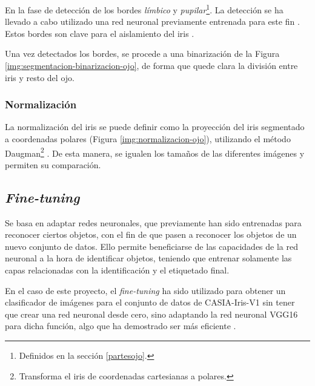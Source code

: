 En la fase de detección de los bordes \textit{límbico} y \textit{pupilar}\footnote{Definidos en la sección \ref{partesojo}.}. La detección se ha llevado a cabo utilizado una red neuronal previamente entrenada para este fin \cite{lozej_end--end_2018}. Estos bordes son clave para el aislamiento del iris \cite{tfg_iris_2020}.




Una vez detectados los bordes, se procede a una binarización de la Figura \ref{img:segmentacion-binarizacion-ojo}, de forma que quede clara la división entre iris y resto del ojo.



\subsubsection{Normalización}\label{subsubsec:normalizacion}

La normalización del iris se puede definir como la proyección del iris segmentado a coordenadas polares (Figura \ref{img:normalizacion-ojo}), utilizando el método Daugman\footnote{Transforma el iris de coordenadas cartesianas a polares.} \cite{daugman_normalization_1993}. De esta manera, se igualen los tamaños de las diferentes imágenes y permiten su comparación.



\subsection{\textit{Fine-tuning}}\label{subsec:fine-tuning}
 Se basa en adaptar redes neuronales, que previamente han sido entrenadas para reconocer ciertos objetos, con el fin de que pasen a reconocer los objetos de un nuevo conjunto de datos. 
 Ello permite beneficiarse de las capacidades de la red neuronal a la hora de identificar objetos, teniendo que entrenar solamente las capas relacionadas con la identificación y el etiquetado final. 
 
 En el caso de este proyecto, el \textit{fine-tuning} ha sido utilizado para obtener un clasificador de imágenes para el conjunto de datos de CASIA-Iris-V1 sin tener que crear una red neuronal desde cero, sino adaptando la red
  neuronal VGG16 para dicha función, algo que ha demostrado ser más eficiente \cite{boyd_deep_2020}.

